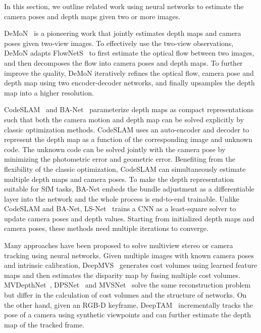 \documentclass[letterpaper, 10 pt, conference]{ieeeconf}  %
\begin{document}
In this section, we outline related work using neural networks to estimate the camera poses and depth maps given two or more images.
 
DeMoN~\cite{demon} is a pioneering work that jointly estimates depth maps and camera poses given two-view images. To effectively use the two-view observations, DeMoN adapts FlowNetS~\cite{flownet} to first estimate the optical flow between two images, and then decomposes the flow into camera poses and depth maps. To further improve the quality, DeMoN iteratively refines the optical flow, camera pose and depth map using two encoder-decoder networks, and finally upsamples the depth map into a higher resolution.
 
CodeSLAM~\cite{code_slam} and BA-Net~\cite{BA-Net} parameterize depth maps as compact representations such that both the camera motion and depth map can be solved explicitly by classic optimization methods. CodeSLAM uses an auto-encoder and decoder to represent the depth map as a function of the corresponding image and unknown code. The unknown code can be solved jointly with the camera pose by minimizing the photometric error and geometric error. Benefiting from the flexibility of the classic optimization, CodeSLAM can simultaneously estimate multiple depth maps and camera poses. To make the depth representation suitable for SfM tasks, BA-Net embeds the bundle adjustment as a differentiable layer into the network and the whole process is end-to-end trainable. Unlike CodeSLAM and BA-Net, LS-Net~\cite{ls_net} trains a CNN as a least-square solver to update camera poses and depth values. Starting from initialized depth maps and camera poses, these methods need multiple iterations to converge.
 
 
Many approaches have been proposed to solve multiview stereo or camera tracking using neural networks. Given multiple images with known camera poses and intrinsic calibration, DeepMVS~\cite{DeepMVS} generates cost volumes using learned feature maps and then estimates the disparity map by fusing multiple cost volumes. MVDepthNet~\cite{mvdepthnet}, DPSNet~\cite{DPSNet} and MVSNet~\cite{MVSNet,RMVSNet} solve the same reconstruction problem but differ in the calculation of cost volumes and the structure of networks. On the other hand, given an RGB-D keyframe, DeepTAM~\cite{deeptam} incrementally tracks the pose of a camera using synthetic viewpoints and can further estimate the depth map of the tracked frame.
 
\end{document}
